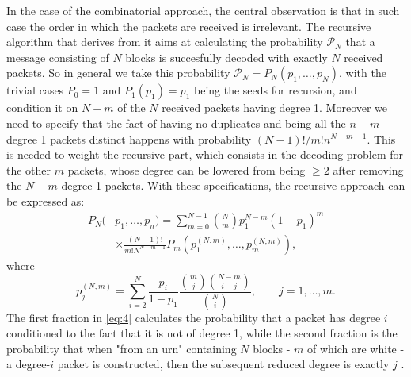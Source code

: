 In the case of the combinatorial approach, the central observation is that in such case the order in which the packets are received is irrelevant. The recursive algorithm that derives from it aims at calculating the probability $\mathcal{P}_N$ that a message consisting of $N$ blocks is succesfully decoded with exactly $N$ received packets. So in general we take this probability $\mathcal{P}_N = P_N(p_1,\dots,p_N)$, with the trivial cases $P_0=1$ and $P_1(p_1) = p_1$ being the seeds for recursion, and condition it on $N-m$ of the $N$ received packets having degree 1. Moreover we need to specify that the fact of having no duplicates and being all the $n-m$ degree 1 packets distinct happens with probability $(N-1)!/m!n^{N-m-1}$. This is needed to weight the recursive part, which consists in the decoding problem for the other $m$ packets, whose degree can be lowered from being $\geq 2$ after removing the $N-m$ degree-1 packets. With these specifications, the recursive approach can be expressed as:
\begin{align}
    P_N(&p_1,\dots,p_n) = \sum_{m=0}^{N-1}\binom{N}{m}p_1^{N-m}(1-p_1)^m\\
    &\times\frac{(N-1)!}{m!N^{N-m-1}}P_m(p_1^{(N,m)},\dots,p_m^{(N,m)}),
    \label{eq:3}
\end{align}
where
\begin{equation}
  p_j^{(N,m)} = \sum_{i=2}^{N}\frac{p_i}{1-p_1}\frac{\binom{m}{j}\binom{N-m}{i-j}}{\binom{N}{i}}, \qquad j = 1,\dots,m.
  \label{eq:4}
\end{equation}
The first fraction in \autoref{eq:4} calculates the probability that a packet has degree $i$ conditioned to the fact that it is not of degree 1, while the second fraction is the probability that when "from an urn" containing $N$ blocks - $m$ of which are white - a degree-$i$ packet is constructed, then the subsequent reduced degree is exactly $j$ \cite{Hyytia2007}.

